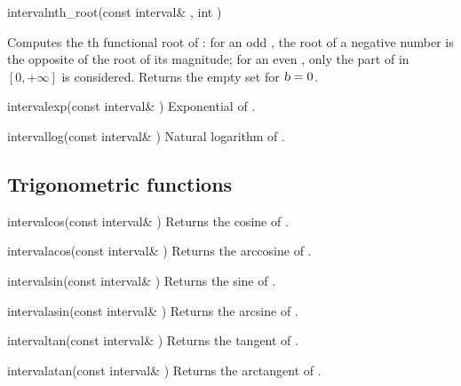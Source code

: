 \documentclass{manual}
\begin{document}
\begin{deffun}{interval}{nth\_root}{(const interval\& , int )}
  \begin{operation}
  \end{operation}
  Computes the th functional root of : for an odd , the
  root of a negative number is the opposite of the root of its magnitude; for an
  even , only the part of  in $[0,+\infty]$ is considered.
  Returns the empty set for $\textsl{b}=0$.
\end{deffun}


\begin{deffun}{interval}{exp}{(const interval\& )}
  Exponential of .
\end{deffun}

\begin{deffun}{interval}{log}{(const interval\& )}
  Natural logarithm of .
\end{deffun}

\subsection{Trigonometric functions}

\begin{deffun}{interval}{cos}{(const interval\& )}
  Returns the cosine of .
\end{deffun}

\begin{deffun}{interval}{acos}{(const interval\& )}
  Returns the arccosine of .
\end{deffun}

\begin{deffun}{interval}{sin}{(const interval\& )}
  Returns the sine of .
\end{deffun}

\begin{deffun}{interval}{asin}{(const interval\& )}
  Returns the arcsine of .
\end{deffun}

\begin{deffun}{interval}{tan}{(const interval\& )}
  Returns the tangent of .
\end{deffun}

\begin{deffun}{interval}{atan}{(const interval\& )}
  Returns the arctangent of .
\end{deffun}
\end{document}
